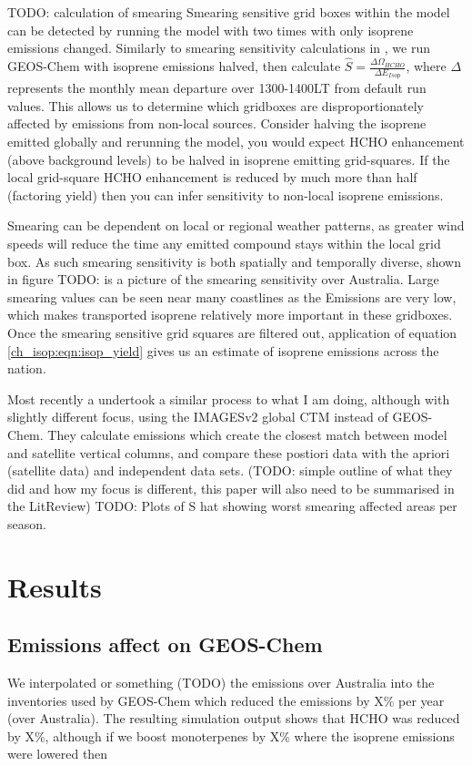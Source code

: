     TODO: calculation of smearing
    Smearing sensitive grid boxes within the model can be detected by running the model with two times with only isoprene emissions changed.
    Similarly to smearing sensitivity calculations in \cite{Marais2012}, we run GEOS-Chem with isoprene emissions halved, then calculate $\hat{S} = \frac{\Delta \Omega_{HCHO}}{\Delta E_{Isop}} $, where $\Delta$ represents the monthly mean departure over 1300-1400LT from default run values.
    This allows us to determine which gridboxes are disproportionately affected by emissions from non-local sources.
    Consider halving the isoprene emitted globally and rerunning the model, you would expect HCHO enhancement (above background levels) to be halved in isoprene emitting grid-squares.
    If the local grid-square HCHO enhancement is reduced by much more than half (factoring yield) then you can infer sensitivity to non-local isoprene emissions.
    
    Smearing can be dependent on local or regional weather patterns, as greater wind speeds will reduce the time any emitted compound stays within the local grid box.
    As such smearing sensitivity is both spatially and temporally diverse, shown in figure TODO: is a picture of the smearing sensitivity over Australia.
    Large smearing values can be seen near many coastlines as the Emissions are very low, which makes transported isoprene relatively more important in these gridboxes.
    Once the smearing sensitive grid squares are filtered out, application of equation \ref{ch_isop:eqn:isop_yield} gives us an estimate of isoprene emissions across the nation.
    
    Most recently a \citet{Bauwens2016} undertook a similar process to what I am doing, although with slightly different focus, using the IMAGESv2 global CTM instead of GEOS-Chem.
    They calculate emissions which create the closest match between model and satellite vertical columns, and compare these postiori data with the apriori (satellite data) and independent data sets.
    (TODO: simple outline of what they did and how my focus is different, this paper will also need to be summarised in the LitReview)
    TODO: Plots of S hat showing worst smearing affected areas per season.
    
    
\section{Results}
  
  \subsection{Emissions affect on GEOS-Chem}
    We interpolated or something (TODO) the emissions over Australia into the inventories used by GEOS-Chem which reduced the emissions by X\% per year (over Australia).
    The resulting simulation output shows that HCHO was reduced by X\%, although if we boost monoterpenes by X\% where the isoprene emissions were lowered then 
  
